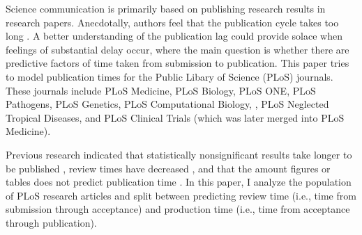 Science communication is primarily based on publishing research results in research papers. Anecdotally, authors feel that the publication cycle takes too long \cite{Himmelstein2015-me}. A better understanding of the publication lag could provide solace when feelings of substantial delay occur, where the main question is whether there are predictive factors of time taken from submission to publication. This paper tries to model publication times for the Public Libary of Science (PLoS) journals. These journals include PLoS Medicine, PLoS Biology, PLoS ONE, PLoS Pathogens, PLoS Genetics, PLoS Computational Biology, , PLoS Neglected Tropical Diseases, and PLoS Clinical Trials (which was later merged into PLoS Medicine).

Previous research indicated that statistically nonsignificant results take longer to be published \cite{ioannidis1998}, review times have decreased \cite{lyman2013}, and that the amount figures or tables does not predict publication time \cite{lee2013}. In this paper, I analyze the population of PLoS research articles and split between predicting review time (i.e., time from submission through acceptance) and production time (i.e., time from acceptance through publication). 
  